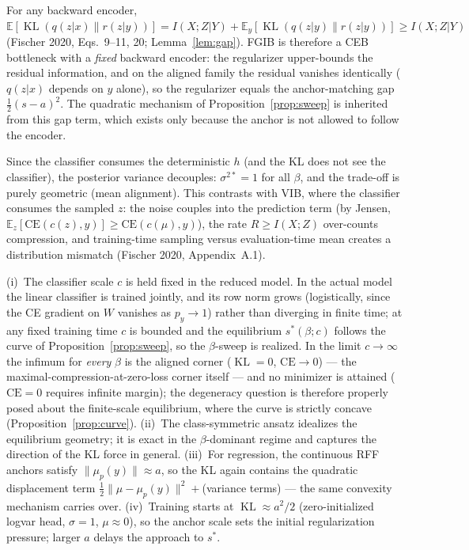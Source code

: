 \begin{remark}\label{rem:residual}
For any backward encoder, $\mathbb{E}[\operatorname{KL}(q(z|x)\|r(z|y))]
= I(X;Z|Y) + \mathbb{E}_y[\operatorname{KL}(q(z|y)\|r(z|y))]
\ge I(X;Z|Y)$ (Fischer 2020, Eqs.~9--11, 20; Lemma~\ref{lem:gap}). FGIB is therefore a
CEB bottleneck with a \emph{fixed} backward encoder: the regularizer upper-bounds the
residual information, and on the aligned family the residual vanishes identically
($q(z|x)$ depends on $y$ alone), so the regularizer equals the anchor-matching gap
$\tfrac{1}{2}(s-a)^2$. The quadratic mechanism of Proposition~\ref{prop:sweep} is
inherited from this gap term, which exists only because the anchor is not allowed to
follow the encoder.
\end{remark}

\begin{remark}
Since the classifier consumes the deterministic $h$ (and the KL does not see the
classifier), the posterior variance decouples: $\sigma^{2*} = 1$ for all $\beta$, and
the trade-off is purely geometric (mean alignment). This contrasts with VIB, where the
classifier consumes the sampled $z$: the noise couples into the prediction term (by
Jensen, $\mathbb{E}_z[\mathrm{CE}(c(z),y)] \ge \mathrm{CE}(c(\mu),y)$), the rate
$R \ge I(X;Z)$ over-counts compression, and training-time sampling versus
evaluation-time mean creates a distribution mismatch (Fischer 2020, Appendix~A.1).
\end{remark}

\begin{remark}\label{rem:caveats}
(i)~The classifier scale $c$ is held fixed in the reduced model. In the actual model the
linear classifier is trained jointly, and its row norm grows (logistically, since the CE
gradient on $W$ vanishes as $p_y \to 1$) rather than diverging in finite time; at any
fixed training time $c$ is bounded and the equilibrium $s^*(\beta; c)$ follows the curve
of Proposition~\ref{prop:sweep}, so the $\beta$-sweep is realized. In the limit
$c \to \infty$ the infimum for \emph{every} $\beta$ is the aligned corner
($\operatorname{KL} = 0$, $\mathrm{CE} \to 0$) --- the
maximal-compression-at-zero-loss corner itself --- and no minimizer is attained
($\mathrm{CE} = 0$ requires infinite margin); the degeneracy question is therefore
properly posed about the finite-scale equilibrium, where the curve is strictly concave
(Proposition~\ref{prop:curve}). (ii)~The class-symmetric ansatz idealizes the
equilibrium geometry; it is exact in the $\beta$-dominant regime and captures the
direction of the KL force in general. (iii)~For regression, the continuous RFF anchors
satisfy $\|\mu_p(y)\| \approx a$, so the KL again contains the quadratic displacement
term $\tfrac{1}{2}\|\mu - \mu_p(y)\|^2 + {}$(variance terms) --- the same convexity
mechanism carries over. (iv)~Training starts at $\operatorname{KL} \approx a^2/2$
(zero-initialized logvar head, $\sigma = 1$, $\mu \approx 0$), so the anchor scale sets
the initial regularization pressure; larger $a$ delays the approach to $s^*$.
\end{remark}

